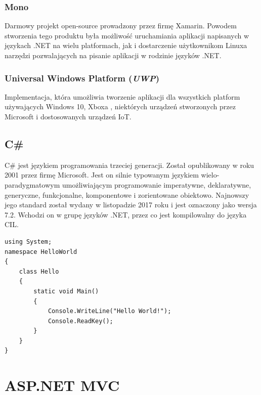 \subsection{Mono}
Darmowy projekt open-source prowadzony przez firmę Xamarin. Powodem stworzenia tego produktu była możliwość uruchamiania aplikacji napisanych w językach .NET na wielu platformach, jak i dostarczenie użytkownikom Linuxa narzędzi pozwalających na pisanie aplikacji w rodzinie języków .NET.
\subsection{Universal Windows Platform (\textit{UWP})}
Implementacja, która umożliwia tworzenie aplikacji dla wszystkich platform używających Windows 10, Xboxa , niektórych urządzeń stworzonych przez Microsoft i dostosowanych urządzeń IoT.


\section{C\#}

C\# jest językiem programowania trzeciej generacji. Został opublikowany w roku 2001 przez firmę Microsoft. Jest on silnie typowanym językiem wielo-paradygmatowym umożliwiającym programowanie imperatywne, deklaratywne, generyczne, funkcjonalne, komponentowe i zorientowane obiektowo. Najnowszy jego standard został wydany w listopadzie 2017 roku i jest oznaczony jako wersja 7.2. Wchodzi on w grupę języków .NET, przez co jest kompilowalny do języka CIL. \cite{CPlotekInfo}
\begin{minipage}{\linewidth}
\begin{lstlisting}[frame=single, numbers=none,captionpos=b, 
caption={Przykładowy kod aplikacji ''Hello World'' w języku C\#}]
using System;
namespace HelloWorld
{
    class Hello 
    {
        static void Main() 
        {
            Console.WriteLine("Hello World!");
            Console.ReadKey();
        }
    }
}
\end{lstlisting}
\end{minipage}
\newpage
{\let\cleardoublepage\relax \chapter{ASP.NET MVC}}


